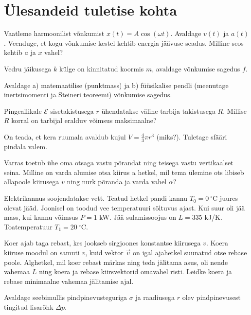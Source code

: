 \documentclass[a4paper,11pt,twocolumn]{article}
\begin{document}
\section{Ülesandeid tuletise kohta}
\begin{question}
	Vaatleme harmoonilist võnkumist \( x(t) = A \cos(ωt) \). Avaldage \( v(t) \) ja \( a(t) \). Veenduge, et kogu võnkumise kestel kehtib energia jäävuse seadus. Milline seos kehtib \( a \) ja \( x \) vahel?
\end{question}
\begin{question}
	Vedru jäikusega \( k \) külge on kinnitatud koormis \( m \), avaldage võnkumise sagedus \( f \).
\end{question}
\begin{question}
	Avaldage a) matemaatilise (punktmass) ja b) füüsikalise pendli (meenutage inertsimomenti ja Steineri teoreemi) võnkumise sagedus.
\end{question}
\begin{question}
	Pingeallikale \( \mathcal{E} \) sisetakistusega \( r \) ühendatakse väline tarbija takistusega \( R \). Millise \( R \) korral on tarbijal eralduv võimsus maksimaalne?
\end{question}
\begin{question}
	On teada, et kera ruumala avaldub kujul \( V=\frac{4}{3}\pi r^3 \)
	(miks?). Tuletage sfääri pindala valem.
\end{question}
\begin{question}
	Varras toetub ühe oma otsaga vastu põrandat ning teisega vastu vertikaalset seina. Milline on varda alumise otsa kiirus \( u \) hetkel, mil tema ülemine ots libiseb allapoole kiirusega \( v \) ning nurk põranda ja varda vahel \( \alpha \)?
\end{question}
\begin{question}[Lõppv 2004, G7][mat1][\columnwidth]
	Elektrikannus soojendatakse vett. Teatud hetkel pandi kannu \( T_0 = 0\ ^\circ\)C juures olevat jääd. Joonisel on toodud vee temperatuuri sõltuvus ajast. Kui suur oli jää mass, kui kannu võimsus \( P = 1 \) kW. Jää sulamissoojus on \( L = 335 \) kJ/K. Toatemperatuur \( T_1 = 20\ ^\circ \)C.
\end{question}
\begin{question}
	Koer ajab taga rebast, kes jookseb sirgjoones konstantse kiirusega \( v \). Koera kiiruse moodul on samuti \( v \), kuid vektor \( \vec{v} \) on igal ajahetkel suunatud otse rebase poole. Alghetkel, mil koer rebast märkas ning teda jälitama asus, oli nende vahemaa \( L \) ning koera ja rebase kiirsvektorid omavahel risti. Leidke koera ja rebase minimaalne vahemaa jälitamise ajal.
\end{question}
\begin{question}
	Avaldage seebimullis pindpinevusteguriga \( \sigma \) ja raadiusega \( r \) olev pindpinevusest tingitud lisarõhk \( \Delta p \).
\end{question}
\end{document}
